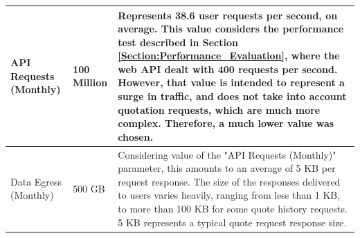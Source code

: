 \documentclass[12pt, reqno, oneside]{amsbook}
\theoremstyle{definition}
\theoremstyle{definition}
\numberwithin{section}{chapter}
\numberwithin{table}{chapter}
\numberwithin{figure}{chapter}
\begin{document}
\begin{longtable}{|M{70pt}|M{55pt}|m{300pt}|}
  \hline
  \endlastfoot
  \hline
  API Requests (Monthly)
   & 100 Million
   & Represents 38.6 user requests per second, on average. This value considers the performance test described in Section \ref{Section:Performance_Evaluation}, where the web \ac{API} dealt with 400 requests per second. However, that value is intended to represent a surge in traffic, and does not take into account quotation requests, which are much more complex. Therefore, a much lower value was chosen.                                                                    \\
  \hline
  Data Egress (Monthly)
   & 500 GB
   & Considering value of the "API Requests (Monthly)" parameter, this amounts to an average of 5 \ac{KB} per request response. The size of the responses delivered to users varies heavily, ranging from less than 1 \ac{KB}, to more than 100 \ac{KB} for some quote history requests. 5 \ac{KB} represents a typical quote request response size.                                                                                                                                     \\


\end{longtable}
\end{document}
